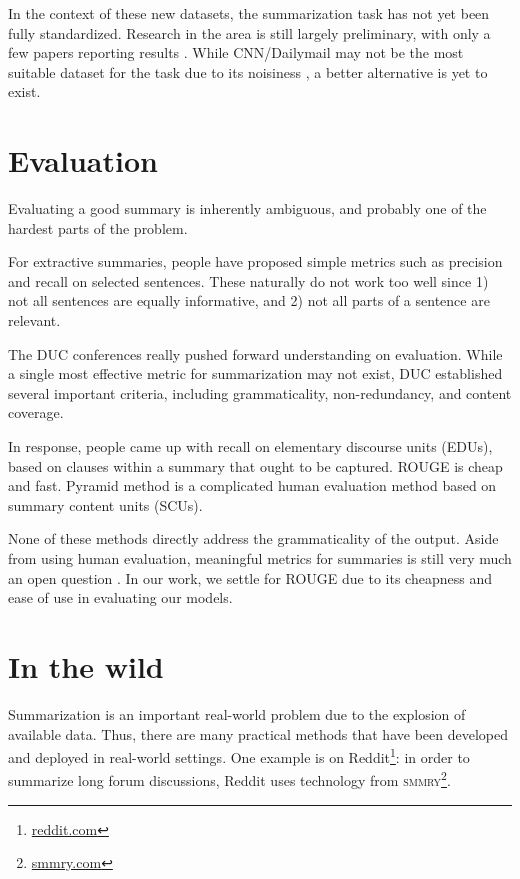\documentclass[11pt]{report}
\begin{document}
In the context of these new datasets, the summarization task has not yet been fully standardized. Research in the area is still largely preliminary, with only a few papers reporting results \citep{nallapati2016seq2seq}. While CNN/Dailymail may not be the most suitable dataset for the task due to its noisiness \citep{Chen2016}, a better alternative is yet to exist.

\section{Evaluation}

Evaluating a good summary is inherently ambiguous, and probably one of the hardest parts of the problem.

For extractive summaries, people have proposed simple metrics such as precision and recall on selected sentences. These naturally do not work too well since 1) not all sentences are equally informative, and 2) not all parts of a sentence are relevant.

The DUC conferences really pushed forward understanding on evaluation. While a single most effective metric for summarization may not exist, DUC established several important criteria, including grammaticality, non-redundancy, and content coverage.

In response, people came up with recall on elementary discourse units (EDUs), based on clauses within a summary that ought to be captured. ROUGE \cite{lin2004rouge} is cheap and fast. Pyramid method is a complicated human evaluation method based on summary content units (SCUs). 

None of these methods directly address the grammaticality of the output. Aside from using human evaluation, meaningful metrics for summaries is still very much an open question \citep{toutanova2016summarymetrics}. In our work, we settle for ROUGE due to its cheapness and ease of use in evaluating our models.


\section{In the wild}

Summarization is an important real-world problem due to the explosion of available data. Thus, there are many practical methods that have been developed and deployed in real-world settings. One example is on Reddit\footnote{\url{reddit.com}}: in order to summarize long forum discussions, Reddit uses technology from \textsc{smmry}\footnote{\url{smmry.com}}.
\end{document}
